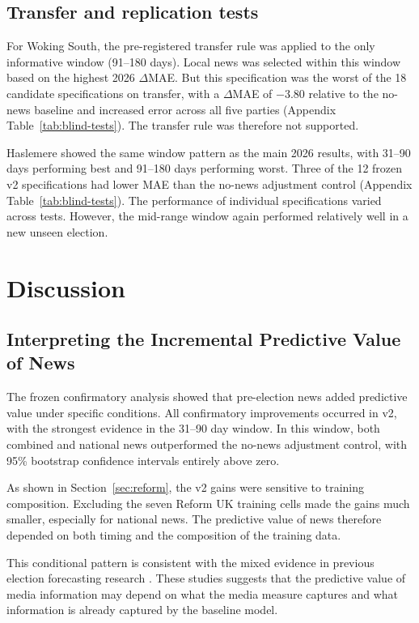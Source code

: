 \documentclass[final-report]{report-template}
\begin{document}
\subsection{Transfer and replication tests}
\label{sec:transfer}

For Woking South, the pre-registered transfer rule was applied to the only informative window (91--180 days). Local news was selected within this window based on the highest 2026 $\Delta$MAE. But this specification was the worst of the 18 candidate specifications on transfer, with a $\Delta$MAE of $-3.80$ relative to the no-news baseline and increased error across all five parties (Appendix Table~\ref{tab:blind-tests}). The transfer rule was therefore not supported.

Haslemere showed the same window pattern as the main 2026 results, with 31--90 days performing best and 91--180 days performing worst. Three of the 12 frozen v2 specifications had lower MAE than the no-news adjustment control (Appendix Table~\ref{tab:blind-tests}). The performance of individual specifications varied across tests. However, the mid-range window again performed relatively well in a new unseen election.

\section{Discussion}
\subsection{Interpreting the Incremental Predictive Value of News}

The frozen confirmatory analysis showed that pre-election news added predictive value under specific conditions. All confirmatory improvements occurred in v2, with the strongest evidence in the 31--90 day window. In this window, both combined and national news outperformed the no-news adjustment control, with 95\% bootstrap confidence intervals entirely above zero.

As shown in Section~\ref{sec:reform}, the v2 gains were sensitive to training composition. Excluding the seven Reform UK training cells made the gains much smaller, especially for national news. The predictive value of news therefore depended on both timing and the composition of the training data.

This conditional pattern is consistent with the mixed evidence in previous election forecasting research \parencite{UMEDA2023956,BELANGER2012702}. These studies suggests that the predictive value of media information may depend on what the media measure captures and what information is already captured by the baseline model.
\end{document}
